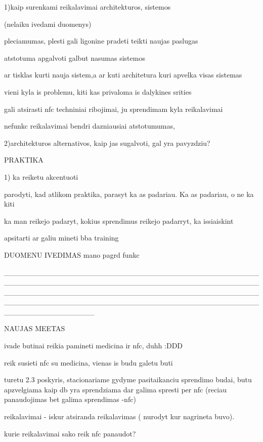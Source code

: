 1)kaip surenkami reikalavimai architekturos, sistemos

(nelaiku ivedami duomenys)


pleciamumas,  plesti gali ligonine pradeti teikti naujas paslugas

atstotuma apgalvoti
galbut nasumas sistemos


ar tisklas kurti nauja sistem,a ar kuti architetura kuri apvelka visas sistemas





vieni kyla is problemu, kiti kas privaloma is dalykines srities

gali atsirasti nfc techniniai ribojimai, ju sprendimam kyla reikalavimai




nefunkc reikalavimai bendri dazniausiai
atstotumumas, 


2)architekturos alternativos, kaip jas sugalvoti, gal yra pavyzdziu?





PRAKTIKA

1) ka reiketu akcentuoti

parodyti, kad atlikom praktika, parasyt ka as padariau. Ka as padariau, o ne ka kiti

ka man reikejo padaryt, kokius sprendimus reikejo padarryt, ka issiaiskint 

apsitarti ar galiu mineti bba training




DUOMENU IVEDIMAS mano pagrd funkc


_________________________________________________________________________________________________________________________________________________________________________________________________________________

NAUJAS MEETAS


ivade butinai reikia pamineti medicina ir nfc, duhh :DDD

reik susieti nfc su medicina, vienas is budu galetu buti

turetu 2.3 poskyris, stacionariame gydyme pasitaikanciu sprendimo budai, butu apzvelgiama kaip db yra sprendziama dar galima spresti per nfc (reciau panaudojimas bet galima sprendimas -nfc)



reikalavimai - iskur atsiranda reikalavimas ( nurodyt kur nagrineta buvo). 


kurie reikalavimai sako reik nfc panaudot?



